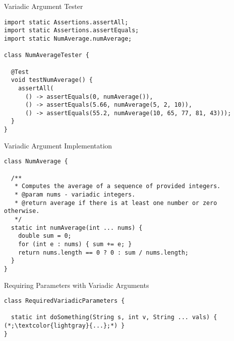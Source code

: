 \begin{cl}[]{Variadic Argument  Tester}
\begin{lstlisting}[language=MyJava]
import static Assertions.assertAll;
import static Assertions.assertEquals;
import static NumAverage.numAverage;

class NumAverageTester {

  @Test
  void testNumAverage() {
    assertAll(
      () -> assertEquals(0, numAverage()),
      () -> assertEquals(5.66, numAverage(5, 2, 10)),
      () -> assertEquals(55.2, numAverage(10, 65, 77, 81, 43)));
  }
}
\end{lstlisting}
\end{cl}

\begin{cl}[]{Variadic Argument  Implementation}
\begin{lstlisting}[language=MyJava]
class NumAverage {

  /**
   * Computes the average of a sequence of provided integers.
   * @param nums - variadic integers.
   * @return average if there is at least one number or zero otherwise.
   */
  static int numAverage(int ... nums) {
    double sum = 0;
    for (int e : nums) { sum += e; }
    return nums.length == 0 ? 0 : sum / nums.length;
  }
}
\end{lstlisting}
\end{cl}


\begin{cl}[]{Requiring Parameters with Variadic Arguments}
\begin{lstlisting}[language=MyJava]
class RequiredVariadicParameters {

  static int doSomething(String s, int v, String ... vals) { (*;\textcolor{lightgray}{...};*) }
}
\end{lstlisting}
\end{cl}

